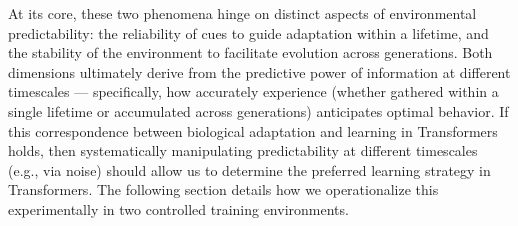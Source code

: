 At its core, these two phenomena hinge on distinct aspects of environmental predictability: the reliability of cues to guide adaptation within a lifetime, and the stability of the environment to facilitate evolution across generations. Both dimensions ultimately derive from the predictive power of information at different timescales --- specifically, how accurately experience (whether gathered within a single lifetime or accumulated across generations) anticipates optimal behavior. If this correspondence between biological adaptation and learning in Transformers holds, then systematically manipulating predictability at different timescales (e.g., via noise) should allow us to determine the preferred learning strategy in Transformers. The following section details how we operationalize this experimentally in two controlled training environments.





